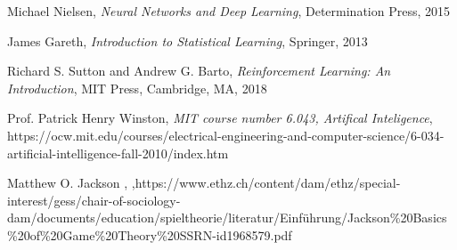 \documentclass[licencjacka]{pracamgr}
\begin{document}
\begin{thebibliography}{99}


	 Michael Nielsen, \textit{Neural Networks and Deep Learning}, Determination Press, 2015

	 James Gareth, \textit{Introduction to Statistical Learning}, Springer, 2013
	
	 Richard S. Sutton and Andrew G. Barto, \textit{Reinforcement Learning: An Introduction},  MIT Press, Cambridge, MA, 2018
	
	 Prof. Patrick Henry Winston, \textit{MIT course number 6.043, Artifical Inteligence}, https://ocw.mit.edu/courses/electrical-engineering-and-computer-science/6-034-artificial-intelligence-fall-2010/index.htm
	
	 Matthew O. Jackson , ,\linebreak https://www.ethz.ch/content/dam/ethz/special-interest/gess/chair-of-sociology-dam/documents/education/spieltheorie/literatur/Einführung/Jackson\linebreak\%20Basics\%20of\%20Game\%20Theory\%20SSRN-id1968579.pdf

\end{thebibliography}
\end{document}
